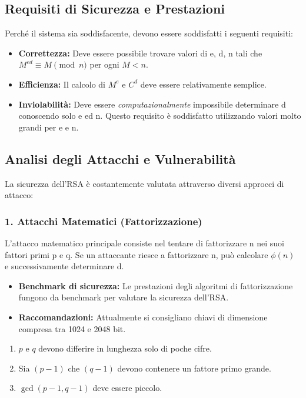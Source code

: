 \documentclass{article}
\begin{document}
\vspace{0.8cm}

\subsection*{Requisiti di Sicurezza e Prestazioni}

Perché il sistema sia soddisfacente, devono essere soddisfatti i seguenti requisiti:

\begin{itemize}
    \item \textbf{Correttezza:} Deve essere possibile trovare valori di e, d, n tali che $M^{ed} \equiv M \pmod n$ per ogni $M < n$.
    \item \textbf{Efficienza:} Il calcolo di $M^e$ e $C^d$ deve essere relativamente semplice.
    \item \textbf{Inviolabilità:} Deve essere \textit{computazionalmente} impossibile determinare d conoscendo solo e ed n. Questo requisito è soddisfatto utilizzando valori molto grandi per e e n.
\end{itemize}

\subsection*{Analisi degli Attacchi e Vulnerabilità}

La sicurezza dell'RSA è costantemente valutata attraverso diversi approcci di attacco:

\subsubsection*{1. Attacchi Matematici (Fattorizzazione)}

L'attacco matematico principale consiste nel tentare di fattorizzare n nei suoi fattori primi p e q. Se un attaccante riesce a fattorizzare n, può calcolare $\phi(n)$ e successivamente determinare d.

\begin{itemize}
    \item \textbf{Benchmark di sicurezza:} Le prestazioni degli algoritmi di fattorizzazione fungono da benchmark per valutare la sicurezza dell'RSA.
    \item \textbf{Raccomandazioni:} Attualmente si consigliano chiavi di dimensione compresa tra 1024 e 2048 bit.
\end{itemize}

\begin{enumerate}
    \item $p$ e $q$ devono differire in lunghezza solo di poche cifre.
    \item Sia $(p - 1)$ che $(q - 1)$ devono contenere un fattore primo grande.
    \item $\gcd(p - 1, q - 1)$ deve essere piccolo.
\end{enumerate}
\end{document}
